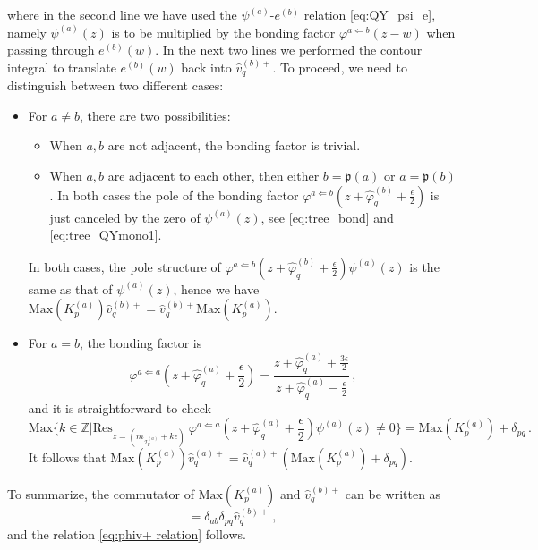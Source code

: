 \documentclass[12pt,a4paper]{article}
\renewcommand{\(}{\left(}
\renewcommand{\)}{\right)}
\renewcommand{\(}{\left(}
\renewcommand{\)}{\right)}
\begin{document}
where in the second line we have used the $\psi^{(a)}$-$e^{(b)}$ relation \eqref{eq:QY_psi_e}, namely $\psi^{(a)}(z)$ is to be multiplied by the bonding factor $\varphi^{a\Leftarrow b}(z-w)$ when passing through $e^{(b)}(w)$. 
In the next two lines we performed the contour integral to translate $e^{(b)}(w)$ back into $\hat{v}^{(b)+}_q$. 
To proceed, we need to distinguish between two different cases:
\begin{itemize}
\item For $a\neq b$, there are two possibilities: 
\begin{itemize}
\item When $a,b$ are not adjacent, the bonding factor is trivial.
\item When $a,b$ are adjacent to each other, then either $b=\mathfrak{p}(a)$ or $a=\mathfrak{p}(b)$. 
In both cases the pole of the bonding factor $\varphi^{a\Leftarrow b}(z+\hat{\varphi}^{(b)}_{q}+\frac{\epsilon}{2})$ is just canceled by the zero of $\psi^{(a)}(z)$, see \eqref{eq:tree_bond} and \eqref{eq:tree_QYmono1}.
\end{itemize}
In both cases, the pole structure of $\varphi^{a\Leftarrow b}(z+\hat{\varphi}^{(b)}_{q}+\frac{\epsilon}{2})\psi^{(a)}(z)$ is the same as that of $\psi^{(a)}(z)$, hence we have $\text{Max}( K^{(a)}_{p}) \hat{v}^{(b)+}_q= \hat{v}^{(b)+}_q\text{Max}( K^{(a)}_{p})$.
    
\item For $a=b$, the bonding factor is 
\begin{equation}\varphi^{a\Leftarrow a}(z+\hat{\varphi}^{(a)}_{q}+\frac{\epsilon}{2})=\frac{z+\hat{\varphi}^{(a)}_{q}+\frac{3\epsilon}{2}}{z+\hat{\varphi}^{(a)}_{q}-\frac{\epsilon}{2}}\,,\end{equation}
and it is straightforward to check \begin{equation}\text{Max}\{ k\in \mathbb{Z}|\text{Res}_{z=(m_{\mathcal{I}^{(a)}_{p}}+k\epsilon)}\ \varphi^{a\Leftarrow a}(z+\hat{\varphi}^{(a)}_{q}+\frac{\epsilon}{2})\psi^{(a)}(z)\neq 0\}=\text{Max}( K^{(a)}_{p})+\delta_{pq}\,.\end{equation}
It follows that $\text{Max}( K^{(a)}_{p}) \hat{v}^{(a)+}_q= \hat{v}^{(a)+}_q(\text{Max}( K^{(a)}_{p})+\delta_{pq})$.
\end{itemize}
To summarize, the commutator of $\text{Max}( K^{(a)}_{p})$ and $\hat{v}^{(b)+}_q$ can be written as
\begin{equation}
[\text{Max}( K^{(a)}_{p}),\hat{v}^{(b)+}_q]=\delta_{ab}\delta_{pq}\hat{v}^{(b)+}_q\,,
\end{equation}
and the relation \eqref{eq:phiv+ relation} follows.
\end{document}
